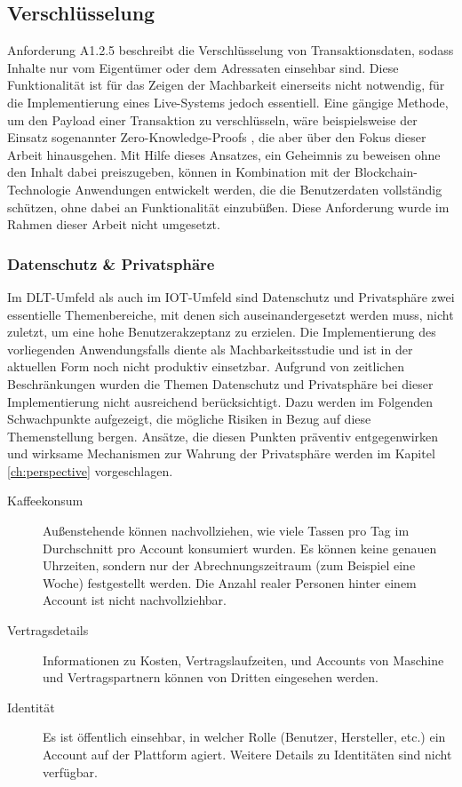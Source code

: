 \subsection{Verschlüsselung}
\label{subsec:implementation:requirements:encryption}
Anforderung A1.2.5 beschreibt die Verschlüsselung von Transaktionsdaten, sodass Inhalte nur vom Eigentümer oder dem Adressaten einsehbar sind. Diese Funktionalität ist für das Zeigen der Machbarkeit einerseits nicht notwendig, für die Implementierung eines Live-Systems jedoch essentiell. Eine gängige Methode, um den Payload einer Transaktion zu verschlüsseln, wäre beispielsweise der Einsatz sogenannter Zero-Knowledge-Proofs \cite{zeroknowledge2020}, die aber über den Fokus dieser Arbeit hinausgehen. Mit Hilfe dieses Ansatzes, ein Geheimnis zu beweisen ohne den Inhalt dabei preiszugeben, können in Kombination mit der Blockchain-Technologie Anwendungen entwickelt werden, die die Benutzerdaten vollständig schützen, ohne dabei an Funktionalität einzubüßen. Diese Anforderung wurde im Rahmen dieser Arbeit nicht umgesetzt.\\

\subsubsection{Datenschutz \& Privatsphäre}
\label{subsub:implementation:requirements:encryption:privacy}
Im \ac{DLT}-Umfeld als auch im \ac{IOT}-Umfeld sind Datenschutz und Privatsphäre zwei essentielle Themenbereiche, mit denen sich auseinandergesetzt werden muss, nicht zuletzt, um eine hohe Benutzerakzeptanz zu erzielen. Die Implementierung des vorliegenden Anwendungsfalls diente als Machbarkeitsstudie und ist in der aktuellen Form noch nicht produktiv einsetzbar. Aufgrund von zeitlichen Beschränkungen wurden die Themen Datenschutz und Privatsphäre bei dieser Implementierung nicht ausreichend berücksichtigt. Dazu werden im Folgenden Schwachpunkte aufgezeigt, die mögliche Risiken in Bezug auf diese Themenstellung bergen. Ansätze, die diesen Punkten präventiv entgegenwirken und wirksame Mechanismen zur Wahrung der Privatsphäre werden im Kapitel \ref{ch:perspective} vorgeschlagen.\\
\begin{description}
  \item[Kaffeekonsum] Außenstehende können nachvollziehen, wie viele Tassen pro Tag im Durchschnitt pro Account konsumiert wurden. Es können keine genauen Uhrzeiten, sondern nur der Abrechnungszeitraum (zum Beispiel eine Woche) festgestellt werden. Die Anzahl realer Personen hinter einem Account ist nicht nachvollziehbar.
  \item[Vertragsdetails] Informationen zu Kosten, Vertragslaufzeiten, und Accounts von Maschine und Vertragspartnern können von Dritten eingesehen werden.
  \item[Identität] Es ist öffentlich einsehbar, in welcher Rolle (Benutzer, Hersteller, etc.) ein Account auf der Plattform agiert. Weitere Details zu Identitäten sind nicht verfügbar.
\end{description}
